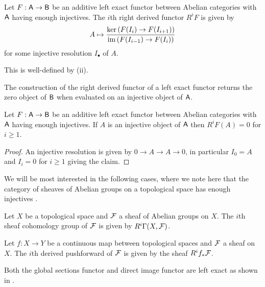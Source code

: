\begin{definition}\label{def: right derived functor of left exact functor}
    Let $F:\mathsf{A}\to\mathsf{B}$ be an additive left exact functor between Abelian categories with $\mathsf{A}$ having enough injectives. The $i$th right derived functor $R^{i}F$ is given by 
    $$A\mapsto\frac{\ker\left(F(I_{i})\to F(I_{i+1})\right)}{\mathrm{im}\left(F(I_{i-1})\to F(I_{i})\right)}$$
    for some injective resolution $I_{\bullet}$ of $A$. 
\end{definition}
\begin{remark}
    This is well-defined by  (ii). 
\end{remark}
The construction of the right derived functor of a left exact functor returns the zero object of $\mathsf{B}$ when evaluated on an injective object of $\mathsf{A}$. 
\begin{lemma}\label{lem: vanishing of higher derived image of injective object}
    Let $F:\mathsf{A}\to\mathsf{B}$ be an additive left exact functor between Abelian categories with $\mathsf{A}$ having enough injectives. If $A$ is an injective object of $\mathsf{A}$ then $R^{i}F(A)=0$ for $i\geq 1$.   
\end{lemma}
\begin{proof}
    An injective resolution is given by $0\to A\to A\to 0$, in particular $I_{0}=A$ and $I_{i}=0$ for $i\geq 1$ giving the claim. 
\end{proof}
We will be most interested in the following cases, where we note here that the category of sheaves of Abelian groups on a topological space has enough injectives \cite[\href{https://stacks.math.columbia.edu/tag/01DL}{Tag 01DL}]{stacks-project}. 
\begin{definition}\label{def: sheaf cohomology}
    Let $X$ be a topological space and $\mathcal{F}$ a sheaf of Abelian groups on $X$. The $i$th sheaf cohomology group of $\mathcal{F}$ is given by $R^{i}\Gamma(X,\mathcal{F})$. 
\end{definition}
\begin{definition}\label{def: derived pushforward}
    Let $f:X\to Y$ be a continuous map between topological spaces and $\mathcal{F}$ a sheaf on $X$. The $i$th derived pushforward of $\mathcal{F}$ is given by the sheaf $R^{i}f_{*}\mathcal{F}$. 
\end{definition}
\begin{remark}
    Both the global sections functor and direct image functor are left exact as shown in .
\end{remark}